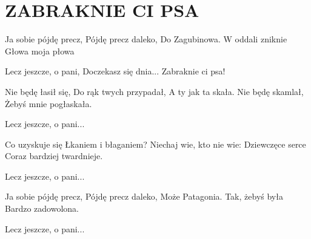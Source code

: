 \documentclass[../../../songbook.tex]{subfiles}
\begin{document}
\TabPositions{8cm} %
\section*{ZABRAKNIE CI PSA}
{}
\vspace{0.5cm}
Ja sobie pójdę precz,	 \newline
Pójdę precz daleko, 	 \newline
Do Zagubinowa. 			 \newline
W oddali zniknie 		 \newline
Głowa moja płowa 		 \newline

\-\hspace{1cm} Lecz jeszcze, o pani,	 \newline
\-\hspace{1cm} Doczekasz się dnia...	 \newline
\-\hspace{1cm} Zabraknie ci psa! 		 \newline

Nie będę łasił się, 		\newline
Do rąk twych przypadał, 		\newline
A ty jak ta skała. 		\newline
Nie będę skamlał, 		\newline
Żebyś mnie pogłaskała. 		\newline

\-\hspace{1cm} Lecz jeszcze, o pani... 		\newline

Co uzyskuje się 		\newline
Łkaniem i błaganiem? 		\newline
Niechaj wie, kto nie wie: 		\newline
Dziewczęce serce      		\newline
Coraz bardziej twardnieje. 		\newline

\-\hspace{1cm} Lecz jeszcze, o pani... 		\newline

Ja sobie pójdę precz, 		\newline
Pójdę precz daleko, 		\newline
Może Patagonia. 		\newline
Tak, żebyś była 		\newline
Bardzo zadowolona. 		\newline

\-\hspace{1cm} Lecz jeszcze, o pani... 		\newline
\end{document}
